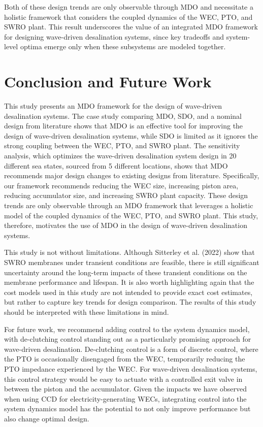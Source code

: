 \documentclass[a4paper,12pt]{elsarticle}
\begin{document}
Both of these design trends are only observable through MDO and necessitate a holistic framework that considers the coupled dynamics of the WEC, PTO, and SWRO plant. This result underscores the value of an integrated MDO framework for designing wave-driven desalination systems, since key tradeoffs and system-level optima emerge only when these subsystems are modeled together.


\section{Conclusion and Future Work} \label{sec:conclusion}

This study presents an MDO framework for the design of wave-driven desalination systems. The case study comparing MDO, SDO, and a nominal design from literature shows that MDO is an effective tool for improving the design of wave-driven desalination systems, while SDO is limited as it ignores the strong coupling between the WEC, PTO, and SWRO plant. The sensitivity analysis, which optimizes the wave-driven desalination system design in 20 different sea states, sourced from 5 different locations, shows that MDO recommends major design changes to existing designs from literature. Specifically, our framework recommends reducing the WEC size, increasing piston area, reducing accumulator size, and increasing SWRO plant capacity. These design trends are only observable through an MDO framework that leverages a holistic model of the coupled dynamics of the WEC, PTO, and SWRO plant. This study, therefore, motivates the use of MDO in the design of wave-driven desalination systems.

This study is not without limitations. Although Sitterley et al. (2022) \cite{Sitterley2022} show that SWRO membranes under transient conditions are feasible, there is still significant uncertainty around the long-term impacts of these transient conditions on the membrane performance and lifespan. It is also worth highlighting again that the cost models used in this study are not intended to provide exact cost estimates, but rather to capture key trends for design comparison. The results of this study should be interpreted with these limitations in mind.

For future work, we recommend adding control to the system dynamics model, with de-clutching control \cite{Ringwood2014} standing out as a particularly promising approach for wave-driven desalination. De-clutching control is a form of discrete control, where the PTO is occasionally disengaged from the WEC, temporarily reducing the PTO impedance experienced by the WEC. For wave-driven desalination systems, this control strategy would be easy to actuate with a controlled exit valve in between the piston and the accumulator. Given the impacts we have observed when using CCD for electricity-generating WECs, integrating control into the system dynamics model has the potential to not only improve performance but also change optimal design.
\end{document}
